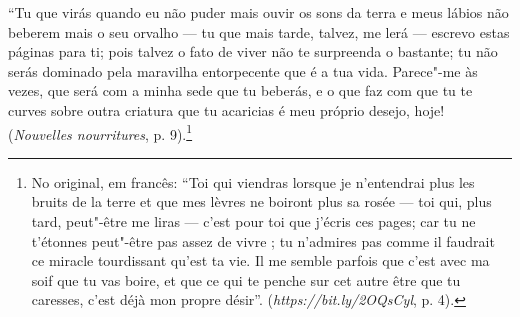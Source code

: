 ``Tu que virás quando eu não puder mais ouvir os sons da terra e meus
lábios não beberem mais o seu orvalho --- tu que mais tarde, talvez, me
lerá --- escrevo estas páginas para ti; pois talvez o fato de viver não te
surpreenda o bastante; tu não serás dominado pela maravilha entorpecente
que é a tua vida. Parece"-me às vezes, que será com a minha sede que tu
beberás, e o que faz com que tu te curves sobre outra criatura que tu
acaricias é meu próprio desejo, hoje! (\emph{Nouvelles nourritures}, p.
9).\footnote{No original, em francês: ``Toi qui viendras lorsque je
  n'entendrai plus les bruits de la terre et que mes lèvres ne boiront
  plus sa rosée --- toi qui, plus tard, peut"-être me liras --- c'est pour
  toi que j'écris ces pages; car tu ne t'étonnes peut"-être pas assez de
  vivre ; tu n'admires pas comme il faudrait ce miracle tourdissant
  qu'est ta vie. Il me semble parfois que c'est avec ma soif que tu vas
  boire, et que ce qui te penche sur cet autre être que tu caresses,
  c'est déjà mon propre désir''.
  (\emph{https://bit.ly/2OQsCyl}, p. 4). \versal{[N. T.]}} \enlargethispage{-\baselineskip}
